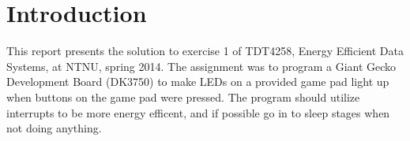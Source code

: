 \section{Introduction}

This report presents the solution to exercise 1 of TDT4258, Energy Efficient Data Systems, at NTNU, spring 2014.
The assignment was to program a Giant Gecko Development Board (DK3750) to make LEDs on a provided game pad light up when buttons on the game pad were pressed.
The program should utilize interrupts to be more energy efficent, and if possible go in to sleep stages when not doing anything.

